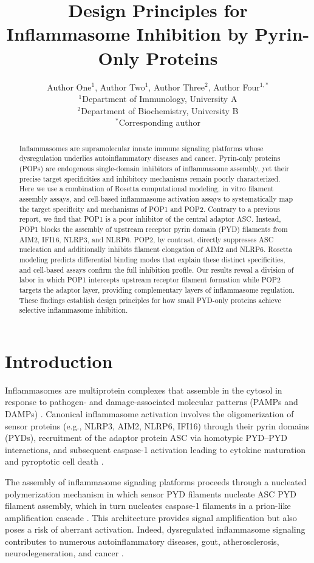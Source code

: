 \documentclass[11pt]{article}
\title{Design Principles for Inflammasome Inhibition by Pyrin-Only Proteins}
\author{
  Author One$^{1}$, Author Two$^{1}$, Author Three$^{2}$, Author Four$^{1,*}$ \\
  $^{1}$Department of Immunology, University A \\
  $^{2}$Department of Biochemistry, University B \\
  $^{*}$Corresponding author
}
\date{}
\begin{document}
\maketitle

\begin{abstract}
Inflammasomes are supramolecular innate immune signaling platforms whose dysregulation underlies autoinflammatory diseases and cancer. Pyrin-only proteins (POPs) are endogenous single-domain inhibitors of inflammasome assembly, yet their precise target specificities and inhibitory mechanisms remain poorly characterized. Here we use a combination of Rosetta computational modeling, in vitro filament assembly assays, and cell-based inflammasome activation assays to systematically map the target specificity and mechanisms of POP1 and POP2. Contrary to a previous report, we find that POP1 is a poor inhibitor of the central adaptor ASC. Instead, POP1 blocks the assembly of upstream receptor pyrin domain (PYD) filaments from AIM2, IFI16, NLRP3, and NLRP6. POP2, by contrast, directly suppresses ASC nucleation and additionally inhibits filament elongation of AIM2 and NLRP6. Rosetta modeling predicts differential binding modes that explain these distinct specificities, and cell-based assays confirm the full inhibition profile. Our results reveal a division of labor in which POP1 intercepts upstream receptor filament formation while POP2 targets the adaptor layer, providing complementary layers of inflammasome regulation. These findings establish design principles for how small PYD-only proteins achieve selective inflammasome inhibition.
\end{abstract}

\section{Introduction}

Inflammasomes are multiprotein complexes that assemble in the cytosol in response to pathogen- and damage-associated molecular patterns (PAMPs and DAMPs) \citep{martinon2002,broz2016}. Canonical inflammasome activation involves the oligomerization of sensor proteins (e.g., NLRP3, AIM2, NLRP6, IFI16) through their pyrin domains (PYDs), recruitment of the adaptor protein ASC via homotypic PYD--PYD interactions, and subsequent caspase-1 activation leading to cytokine maturation and pyroptotic cell death \citep{schroder2010,lu2014}.

The assembly of inflammasome signaling platforms proceeds through a nucleated polymerization mechanism in which sensor PYD filaments nucleate ASC PYD filament assembly, which in turn nucleates caspase-1 filaments in a prion-like amplification cascade \citep{lu2014,cai2014}. This architecture provides signal amplification but also poses a risk of aberrant activation. Indeed, dysregulated inflammasome signaling contributes to numerous autoinflammatory diseases, gout, atherosclerosis, neurodegeneration, and cancer \citep{masters2009,duewell2010,heneka2013}.
\end{document}
